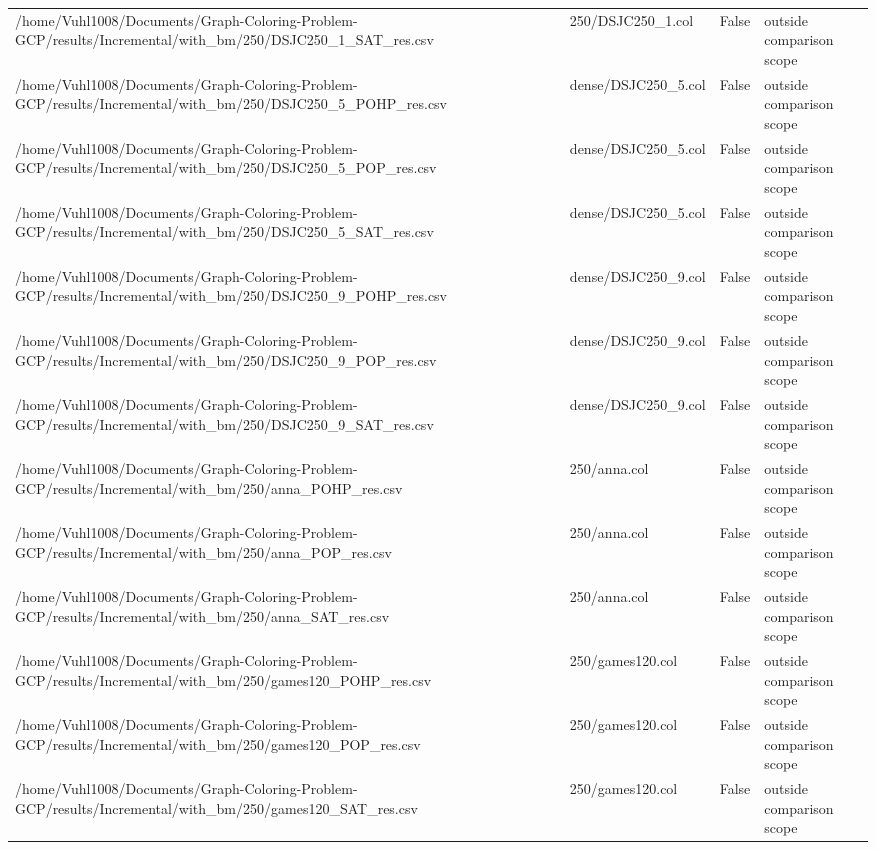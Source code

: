\begin{table}[htbp]
\begin{tabular}{llll}
/home/Vuhl1008/Documents/Graph-Coloring-Problem-GCP/results/Incremental/with\_bm/250/DSJC250\_1\_SAT\_res.csv & 250/DSJC250\_1.col & False & outside comparison scope \\
/home/Vuhl1008/Documents/Graph-Coloring-Problem-GCP/results/Incremental/with\_bm/250/DSJC250\_5\_POHP\_res.csv & dense/DSJC250\_5.col & False & outside comparison scope \\
/home/Vuhl1008/Documents/Graph-Coloring-Problem-GCP/results/Incremental/with\_bm/250/DSJC250\_5\_POP\_res.csv & dense/DSJC250\_5.col & False & outside comparison scope \\
/home/Vuhl1008/Documents/Graph-Coloring-Problem-GCP/results/Incremental/with\_bm/250/DSJC250\_5\_SAT\_res.csv & dense/DSJC250\_5.col & False & outside comparison scope \\
/home/Vuhl1008/Documents/Graph-Coloring-Problem-GCP/results/Incremental/with\_bm/250/DSJC250\_9\_POHP\_res.csv & dense/DSJC250\_9.col & False & outside comparison scope \\
/home/Vuhl1008/Documents/Graph-Coloring-Problem-GCP/results/Incremental/with\_bm/250/DSJC250\_9\_POP\_res.csv & dense/DSJC250\_9.col & False & outside comparison scope \\
/home/Vuhl1008/Documents/Graph-Coloring-Problem-GCP/results/Incremental/with\_bm/250/DSJC250\_9\_SAT\_res.csv & dense/DSJC250\_9.col & False & outside comparison scope \\
/home/Vuhl1008/Documents/Graph-Coloring-Problem-GCP/results/Incremental/with\_bm/250/anna\_POHP\_res.csv & 250/anna.col & False & outside comparison scope \\
/home/Vuhl1008/Documents/Graph-Coloring-Problem-GCP/results/Incremental/with\_bm/250/anna\_POP\_res.csv & 250/anna.col & False & outside comparison scope \\
/home/Vuhl1008/Documents/Graph-Coloring-Problem-GCP/results/Incremental/with\_bm/250/anna\_SAT\_res.csv & 250/anna.col & False & outside comparison scope \\
/home/Vuhl1008/Documents/Graph-Coloring-Problem-GCP/results/Incremental/with\_bm/250/games120\_POHP\_res.csv & 250/games120.col & False & outside comparison scope \\
/home/Vuhl1008/Documents/Graph-Coloring-Problem-GCP/results/Incremental/with\_bm/250/games120\_POP\_res.csv & 250/games120.col & False & outside comparison scope \\
/home/Vuhl1008/Documents/Graph-Coloring-Problem-GCP/results/Incremental/with\_bm/250/games120\_SAT\_res.csv & 250/games120.col & False & outside comparison scope \\

\end{tabular}
\end{table}
